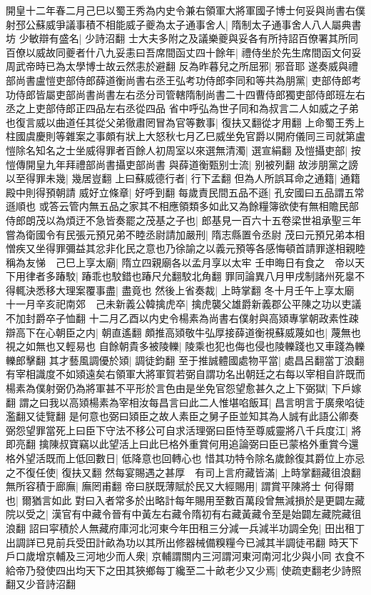 開皇十二年春二月己巳以蜀王秀為内史令兼右領軍大將軍國子博士何妥與尚書右僕射邳公蘇威爭議事積不相能威子夔為太子通事舍人|{
	隋制太子通事舍人八人屬典書坊}
少敏辯有盛名|{
	少詩沼翻}
士大夫多附之及議樂夔與妥各有所持詔百僚署其所同百僚以威故同夔者什八九妥恚曰吾席間函丈四十餘年|{
	禮侍坐於先生席間函文何妥周武帝時已為太學博士故云然恚於避翻}
反為昨暮兒之所屈邪|{
	邪音耶}
遂奏威與禮部尚書盧愷吏部侍郎薛道衡尚書右丞王弘考功侍郎李同和等共為朋黨|{
	吏部侍郎考功侍郎皆屬吏部尚書尚書左右丞分司管轄隋制尚書二十四曹侍郎獨吏部侍郎班左右丞之上吏部侍郎正四品左右丞從四品}
省中呼弘為世子同和為叔言二人如威之子弟也復言威以曲道任其從父弟徹肅罔冒為官等數事|{
	復扶又翻從才用翻}
上命蜀王秀上柱國虞慶則等雜案之事頗有狀上大怒秋七月乙巳威坐免官爵以開府儀同三司就第盧愷除名知名之士坐威得罪者百餘人初周室以來選無清濁|{
	選宣絹翻}
及愷攝吏部|{
	按愷傳開皇九年拜禮部尚書攝吏部尚書}
與薛道衡甄别士流|{
	别被列翻}
故涉朋黨之謗以至得罪未幾|{
	幾居豈翻}
上曰蘇威德行者|{
	行下孟翻}
但為人所誤耳命之通籍|{
	通籍殿中則得預朝請}
威好立條章|{
	好呼到翻}
每歲責民間五品不遜|{
	孔安國曰五品謂五常遜順也}
或答云管内無五品之家其不相應領類多如此又為餘糧簿欲使有無相贍民部侍郎朗茂以為煩迂不急皆奏罷之茂基之子也|{
	郎基見一百六十五卷梁世祖承聖三年}
嘗為衛國令有民張元預兄弟不睦丞尉請加嚴刑|{
	隋志縣置令丞尉}
茂曰元預兄弟本相憎疾又坐得罪彌益其忿非化民之意也乃徐諭之以義元預等各感悔頓首請罪遂相親睦稱為友悌　己巳上享太廟|{
	隋立四親廟各以孟月享以太牢}
壬申晦日有食之　帝以天下用律者多踳駮|{
	踳乖也駮錯也踳尺允翻駮北角翻}
罪同論異八月甲戌制諸州死辠不得輒決悉移大理案覆事盡|{
	盡竟也}
然後上省奏裁|{
	上時掌翻}
冬十月壬午上享太廟　十一月辛亥祀南郊　己未新義公韓擒虎卒|{
	擒虎襲父雄爵新義郡公平陳之功以吏議不加封爵卒子恤翻}
十二月乙酉以内史令楊素為尚書右僕射與高熲專掌朝政素性疎辯高下在心朝臣之内|{
	朝直遙翻}
頗推高熲敬牛弘厚接薛道衡視蘇威蔑如也|{
	蔑無也視之如無也又輕易也}
自餘朝貴多被陵轢|{
	陵乘也犯也侮也侵也陵轢踐也又車踐為轢轢郎擊翻}
其才藝風調優於熲|{
	調徒鈞翻}
至于推誠體國處物平當|{
	處昌呂翻當丁浪翻}
有宰相識度不如熲遠矣右領軍大將軍賀若弼自謂功名出朝廷之右每以宰相自許既而楊素為僕射弼仍為將軍甚不平形於言色由是坐免官怨望愈甚久之上下弼獄|{
	下戶嫁翻}
謂之曰我以高熲楊素為宰相汝每昌言曰此二人惟堪啗飯耳|{
	昌言明言于廣衆啗徒濫翻又徒覽翻}
是何意也弼曰熲臣之故人素臣之舅子臣並知其為人誠有此語公卿奏弼怨望罪當死上曰臣下守法不移公可自求活理弼曰臣恃至尊威靈將八千兵度江|{
	將即亮翻}
擒陳叔寶竊以此望活上曰此巳格外重賞何用追論弼曰臣已蒙格外重賞今還格外望活既而上低回數日|{
	低降意也回轉心也}
惜其功特令除名歲餘復其爵位上亦忌之不復任使|{
	復扶又翻}
然每宴賜遇之甚厚　有司上言府藏皆滿|{
	上時掌翻藏徂浪翻}
無所容積于廊廡|{
	廡罔甫翻}
帝曰朕既薄賦於民又大經賜用|{
	謂賞平陳將士}
何得爾也|{
	爾猶言如此}
對曰入者常多於出略計每年賜用至數百萬段曾無減損於是更闢左藏院以受之|{
	漢官有中藏令晉有中黃左右藏令隋初有右藏黃藏令至是始闢左藏院藏徂浪翻}
詔曰寜積於人無藏府庫河北河東今年田租三分減一兵減半功調全免|{
	田出租丁出調詳已見前兵受田計畝為功以其所出修器械備糗糧今已減其半調徒弔翻}
時天下戶口歲增京輔及三河地少而人衆|{
	京輔謂關内三河謂河東河南河北少與小同}
衣食不給帝乃發使四出均天下之田其狹鄉每丁纔至二十畝老少又少焉|{
	使疏吏翻老少詩照翻又少音詩沼翻}


